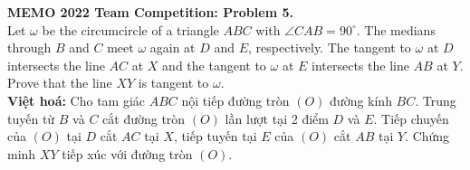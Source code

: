 \documentclass[12pt,a4paper]{article}
\begin{document}
\setlength{\parindent}{0pt}
	
\textbf{MEMO 2022 Team Competition: Problem 5.} \\

Let $\omega$ be the circumcircle of a triangle $ABC$ with $\angle CAB=90^{\circ}$. The medians through $B$ and $C$ meet $\omega$ again at $D$ and $E$, respectively. The tangent to $\omega$ at $D$ intersects the line $AC$ at $X$ and the tangent to $\omega$ at $E$ intersects the line $AB$ at $Y$. Prove that the line $XY$ is tangent to $\omega$.\\

\textbf{Việt hoá:} Cho tam giác $ABC$ nội tiếp đường tròn $(O)$ đường kính $BC$. Trung tuyến từ $B$ và $C$ cắt đường tròn $(O)$ lần lượt tại 2 điểm $D$ và $E$. Tiếp chuyến của $(O)$ tại $D$ cắt $AC$ tại $X$, tiếp tuyến tại $E$ của $(O)$ cắt $AB$ tại $Y$. Chứng minh $XY$ tiếp xúc với đường tròn $(O)$.\\
\end{document}
